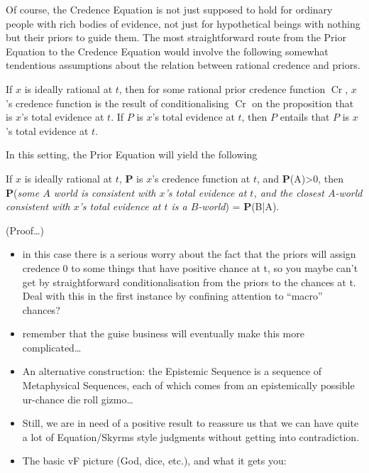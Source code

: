 \documentclass[leqno, 11pt, a5paper, openany]{article}
\DeclareMathOperator{\prior}{Cr}
\begin{document}
Of course, the Credence Equation is not just supposed to hold for ordinary people with rich bodies of evidence, not just for hypothetical beings with nothing but their priors to guide them. The most straightforward route from the Prior Equation to the Credence Equation would involve the following somewhat tendentious assumptions about the relation between rational credence and priors.
\begin{prop}
\litem[Conditionalisation]
	If $x$ is ideally rational at $t$, then for some rational prior credence function $\prior$, $x$'s credence function is the result of conditionalising $\prior$ on the proposition that is $x$'s total evidence at $t$. 
\litem[Introspection]
	If $P$ is $x$'s total evidence at $t$, then $P$ entails that $P$ is $x$'s total evidence at $t$. 
\end{prop}
In this setting, the Prior Equation will yield the following
\begin{prop}
	If $x$ is ideally rational at $t$, \textbf{P} is $x$'s credence function at $t$, and \textbf{P}(A)>0, then \textbf{P}(\emph{some $A$ world is consistent with $x$'s total evidence at $t$, and the closest $A$-world consistent with $x$'s total evidence at $t$ is a $B$-world}) = \textbf{P}(B|A). 
\end{prop}

(Proof\ldots{})

\begin{itemize}
\item
  in this case there is a serious worry about the fact that the priors
  will assign credence 0 to some things that have positive chance at t,
  so you maybe can't get by straightforward conditionalisation from the
  priors to the chances at t. Deal with this in the first instance by
  confining attention to “macro” chances?\\
\item
  remember that the guise business will eventually make this more
  complicated\ldots{}
\item
  An alternative construction: the Epistemic Sequence is a sequence of
  Metaphysical Sequences, each of which comes from an epistemically
  possible ur-chance die roll gizmo\ldots{}
\item
  Still, we are in need of a positive result to reassure us that we can
  have quite a lot of Equation/Skyrms style judgments without getting
  into contradiction.
\item
  The basic vF picture (God, dice, etc.), and what it gets you:
\end{itemize}
\end{document}

